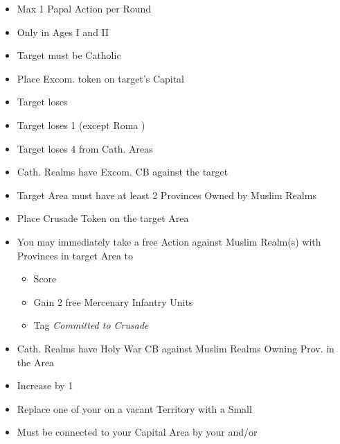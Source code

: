 \documentclass[10pt]{article}
\begin{document}
\framebreak %
\begin{itemize}
	\item Max 1 Papal Action per Round
	\item Only in Ages I and II
\end{itemize}

\begin{itemize}
	\item Target must be Catholic
	\item Place Excom. token on target's Capital
	\item Target loses 
	\item Target loses 1 \cardinal (except Roma \cardinal)
	\item Target loses 4 \influence from Cath. Areas
	\item Cath. Realms have Excom. CB against the target
\end{itemize}

\begin{itemize}
	\item Target Area must have at least 2 Provinces Owned by Muslim Realms
	\item Place Crusade Token on the target Area
	\item You may immediately take a free  Action against Muslim Realm(s) with Provinces in target Area to
	\begin{itemize}
		\item Score 
		\item Gain 2 free Mercenary Infantry Units
		\item Tag \emph{Committed to Crusade}
	\end{itemize}
	\item Cath. Realms have Holy War CB against Muslim Realms Owning Prov. in the Area	
\end{itemize}

\begin{itemize}
	\item Increase \stability by 1
\end{itemize}

\begin{itemize}
	\item Replace one of your \claims on a vacant Territory with a Small \town
	\item Must be connected to your Capital Area by your \towns and/or \ships
\end{itemize}
\end{document}
